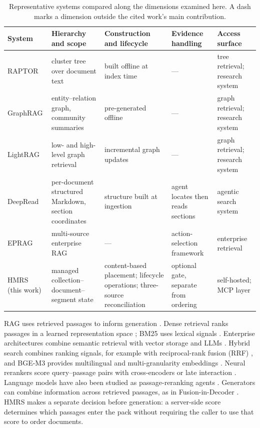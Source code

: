 \begin{table}[!t]
\centering
\small
\setlength{\tabcolsep}{3.5pt}
\renewcommand{\arraystretch}{1.02}
\caption{ Representative systems compared along the dimensions examined here.
A dash marks a dimension outside the cited work's main contribution.}
\label{tab:related-comparison}
\begin{tabular}{@{}>{\raggedright\arraybackslash}p{}>{\raggedright\arraybackslash}p{}>{\raggedright\arraybackslash}p{}>{\raggedright\arraybackslash}p{}>{\raggedright\arraybackslash}p{}@{}}
\toprule
System & Hierarchy and scope & Construction and lifecycle & Evidence handling & Access surface\\
\midrule
RAPTOR \citep{raptor} & cluster tree over document text & built offline at index time & --- & tree retrieval; research system\\
GraphRAG \citep{graphrag} & entity--relation graph, community summaries & pre-generated offline & --- & graph retrieval; research system\\
LightRAG \citep{lightrag} & low- and high-level graph retrieval & incremental graph updates & --- & graph retrieval; research system\\
DeepRead \citep{deepread} & per-document structured Markdown, section coordinates & structure built at ingestion & agent locates then reads sections & agentic search system\\
EPRAG \citep{kinalioglu-kbs-eprag-2026} & multi-source enterprise RAG & --- & action-selection framework & enterprise retrieval\\
HMRS (this work) & managed collection--document--segment state & content-based placement; lifecycle operations; three-source reconciliation & optional gate, separate from ordering & self-hosted; MCP layer\\
\bottomrule
\end{tabular}
\end{table}

RAG uses retrieved passages to inform generation
\citep{rag-lewis,gao-rag-survey-2023}. Dense
retrieval ranks passages in a learned representation space \citep{dpr}; BM25
uses lexical signals \citep{bm25}. Enterprise architectures combine semantic
retrieval with vector storage and LLMs \citep{ghali-kbs-retrieval-2025}.
Hybrid search combines ranking signals, for example with reciprocal-rank
fusion (RRF) \citep{rrf-cormack}, and BGE-M3 provides multilingual and
multi-granularity embeddings \citep{bge-m3}. Neural rerankers score
query--passage pairs with cross-encoders \citep{nogueira-monobert-2019} or
late interaction \citep{khattab-colbert-2020}. Language models have also
been studied as passage-reranking agents \citep{sun-urara}. Generators can
combine information across retrieved passages, as in Fusion-in-Decoder
\citep{izacard-grave}. HMRS makes a separate decision before generation:
a server-side score determines which passages enter the pack without
requiring the caller to use that score to order documents.

